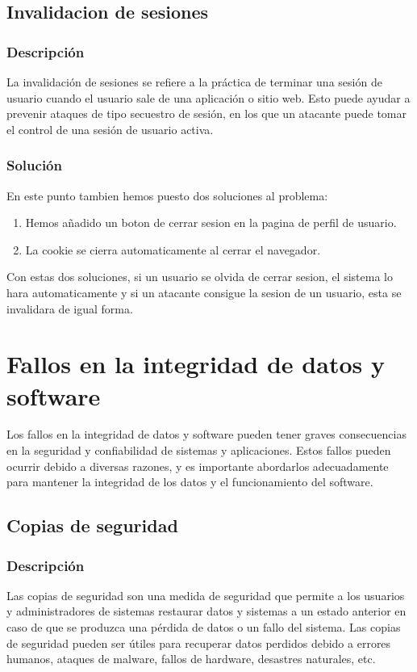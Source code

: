 \documentclass{report}
\begin{document}
            \subsection{Invalidacion de sesiones}
                    \subsubsection{Descripción}
                        La invalidación de sesiones se refiere a la práctica de terminar una sesión de usuario cuando el usuario sale de una aplicación o sitio web. Esto puede ayudar a prevenir ataques de tipo secuestro de sesión, en los que un atacante puede tomar el control de una sesión de usuario activa.
                    \subsubsection{Solución}
                        En este punto tambien hemos puesto dos soluciones al problema:
                        \begin{enumerate}
                            \item Hemos añadido un boton de cerrar sesion en la pagina de perfil de usuario.
                            \item La cookie se cierra automaticamente al cerrar el navegador.
                        \end{enumerate}
                        Con estas dos soluciones, si un usuario se olvida de cerrar sesion, el sistema lo hara automaticamente y si un atacante consigue la sesion de un usuario, esta se invalidara de igual forma.
            \clearpage
        \section{Fallos en la integridad de datos y software}
            Los fallos en la integridad de datos y software pueden tener graves consecuencias en la seguridad y confiabilidad de sistemas y aplicaciones. Estos fallos pueden ocurrir debido a diversas razones, y es importante abordarlos adecuadamente para mantener la integridad de los datos y el funcionamiento del software.
            \subsection{Copias de seguridad}
                \subsubsection{Descripción}
                    Las copias de seguridad son una medida de seguridad que permite a los usuarios y administradores de sistemas restaurar datos y sistemas a un estado anterior en caso de que se produzca una pérdida de datos o un fallo del sistema. Las copias de seguridad pueden ser útiles para recuperar datos perdidos debido a errores humanos, ataques de malware, fallos de hardware, desastres naturales, etc.
\end{document}
